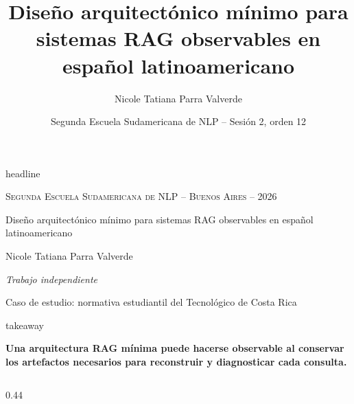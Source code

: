 \documentclass[final]{beamer}
\title{Diseño arquitectónico mínimo para sistemas RAG observables en español latinoamericano}
\author{Nicole Tatiana Parra Valverde}
\institute{Trabajo independiente}
\date{Segunda Escuela Sudamericana de NLP -- Sesión 2, orden 12}
\begin{document}
\begin{frame}[t]
\vspace*{1.90cm}

\begin{beamercolorbox}[wd=\textwidth,sep=0cm]{headline}
  \centering
  {\color{BodyText}\scshape\fontsize{20}{24}\selectfont
    Segunda Escuela Sudamericana de NLP -- Buenos Aires -- 2026\par}
  \vspace{0.30cm}
  {\color{BodyText}\mdseries\fontsize{74}{80}\selectfont
    Diseño arquitectónico mínimo para sistemas RAG observables en español latinoamericano\par}
  \vspace{0.35cm}
  {\color{BodyText}\fontsize{29}{34}\selectfont
    Nicole Tatiana Parra Valverde\par}
  \vspace{0.10cm}
  {\color{BodyText}\itshape\fontsize{23}{28}\selectfont
    Trabajo independiente\par}
  \vspace{0.10cm}
  {\color{BodyText}\fontsize{21}{25}\selectfont
    Caso de estudio: normativa estudiantil del Tecnológico de Costa Rica\par}
\end{beamercolorbox}

\vspace{0.45cm}
\begin{beamercolorbox}[wd=\textwidth,sep=0.42cm,center]{takeaway}
  {\bfseries\fontsize{30}{35}\selectfont
  Una arquitectura RAG mínima puede hacerse observable al conservar los
  artefactos necesarios para reconstruir y diagnosticar cada consulta.\par}
\end{beamercolorbox}
\vspace{0.55cm}

\begin{columns}[T,totalwidth=\textwidth]

\begin{column}{0.44\textwidth}


\end{column}
\end{columns}
\end{frame}
\end{document}

